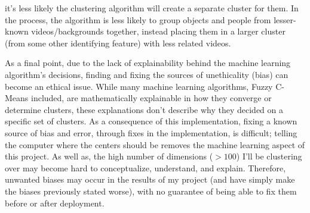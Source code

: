 \documentclass[10pt,twocolumn]{article}
\begin{document}
it’s less likely the clustering algorithm will create a separate cluster for them. In the process, the algorithm is less likely to group objects and people from lesser-known videos/backgrounds together, instead placing them in a larger cluster (from some other identifying feature) with less related videos.

As a final point, due to the lack of explainability behind the machine learning algorithm’s decisions, finding and fixing the sources of unethicality (bias) can become an ethical issue. While many machine learning algorithms, Fuzzy C-Means included, are mathematically explainable in how they converge or determine clusters, these explanations don’t describe why they decided on a specific set of clusters. As a consequence of this implementation, fixing a known source of bias and error, through fixes in the implementation, is difficult; telling the computer where the centers should be removes the machine learning aspect of this project. As well as, the high number of dimensions (\(>100\)) I'll be clustering over may become hard to conceptualize, understand, and explain. Therefore, unwanted biases may occur in the results of my project (and have simply make the biases previously stated worse), with no guarantee of being able to fix them before or after deployment. 
\end{document}
